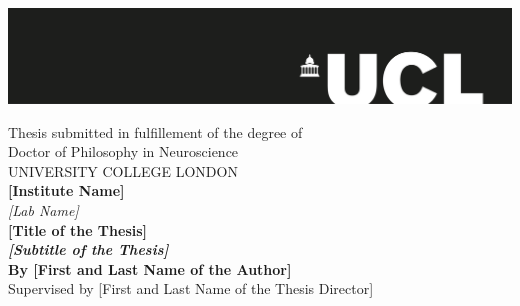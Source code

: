 

\begin{titlepage}
    \noindent \includegraphics[width=\paperwidth]{images/ucl_logo_black} \nopagebreak %
    
    
\begin{center}
\vspace*{4cm}
\large{
Thesis submitted in fulfillement of the degree of\\Doctor of Philosophy in Neuroscience\\
}
\vspace*{1cm}
\large{UNIVERSITY COLLEGE LONDON}\\
\vspace*{1cm}
\large{\textbf{[Institute Name]}}\\
\vspace*{0.5cm}
\large{\textit{[Lab Name]}}\\
\vspace*{1cm}
\LARGE{\textbf{[Title of the Thesis]}}\\
\vspace*{0.5cm}
\large{\textit{\textbf{[Subtitle of the Thesis]}}}\\
\vspace*{2cm}
\large{\textbf{By [First and Last Name of the Author]}}\\
\vspace*{1cm}
Supervised by [First and Last Name of the Thesis Director]\\
\vspace*{1cm}
\end{center}

\begin{figure}[b]
\begin{center}
\end{center}
\end{figure}

\clearpage
\end{titlepage}
